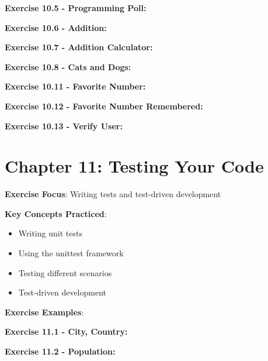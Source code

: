 \textbf{Exercise 10.5 - Programming Poll:}


\textbf{Exercise 10.6 - Addition:}


\textbf{Exercise 10.7 - Addition Calculator:}


\textbf{Exercise 10.8 - Cats and Dogs:}


\textbf{Exercise 10.11 - Favorite Number:}


\textbf{Exercise 10.12 - Favorite Number Remembered:}


\textbf{Exercise 10.13 - Verify User:}


\section*{Chapter 11: Testing Your Code}
\textbf{Exercise Focus}: Writing tests and test-driven development

\textbf{Key Concepts Practiced}:
\begin{itemize}
    \item Writing unit tests
    \item Using the unittest framework
    \item Testing different scenarios
    \item Test-driven development
\end{itemize}

\textbf{Exercise Examples}:

\textbf{Exercise 11.1 - City, Country:}


\textbf{Exercise 11.2 - Population:}


